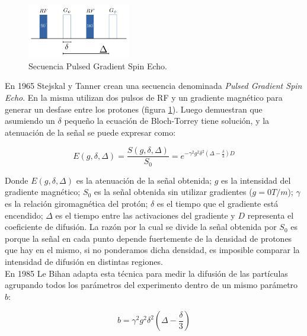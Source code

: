 \begin{figure}
    \begin{center}
        \vspace{-1cm}
        \includegraphics[width=0.4\textwidth]{img/fgp.png}
        \caption{Secuencia Pulsed Gradient Spin Echo.}
        \label{fig:fgp}
    \end{center}
\end{figure}  

En 1965 Stejskal y Tanner \cite{Stejskal1965} crean una secuencia
denominada \textit{Pulsed Gradient Spin Echo}. En la misma utilizan dos
pulsos de RF y un gradiente magn\'etico para generar un desfase entre los
protones (figura \ref{fig:fgp}). Luego demuestran que asumiendo un $\delta$
peque\~no la ecuaci\'on de Bloch-Torrey tiene soluci\'on, y la atenuaci\'on
de la se\~nal se puede expresar como:

\begin{equation}
    E(g, \delta, \Delta) = 
    \frac{S(g, \delta, \Delta)}{S_0} =
         e^{-\gamma^2 g^2 \delta^2 \left(\Delta - \frac{\delta}{3}\right) D} 
    \label{eq:st}
\end{equation}
  
Donde $E(g, \delta, \Delta)$ es la atenuaci\'on de la se\~nal obtenida; 
$g$ es la intensidad del gradiente magn\'etico; $S_0$ es la se\~nal
obtenida sin utilizar gradientes ($g=0 T/m$); $\gamma$ es la relaci\'on
giromagn\'etica del  prot\'on; $\delta$ es el tiempo que el gradiente 
est\'a encendido; $\Delta$ es el tiempo entre las activaciones del
gradiente y $D$ representa el coeficiente de difusi\'on. La raz\'on por la
cual se divide la se\~nal obtenida por $S_0$ es porque la se\~nal en cada
punto depende fuertemente de la densidad de protones que hay en el mismo,
si no ponderamos dicha densidad, es imposible comparar la intensidad de
difusi\'on en distintas regiones. \\

En 1985 Le Bihan \cite{LEBIHAN} adapta esta t\'ecnica para medir la 
difusi\'on de las part\'iculas agrupando todos los par\'ametros del
experimento dentro de un mismo par\'ametro $b$:

$$ b = \gamma^2 g^2 \delta^2 \left(\Delta - \frac{\delta}{3}\right) $$ 

